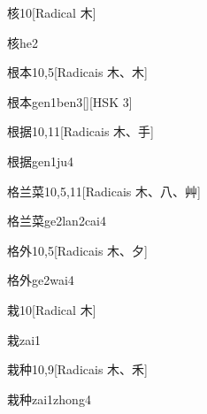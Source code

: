 \begin{entry}{核}{10}[Radical ⽊]
  \begin{phonetics}{核}{he2}
  \end{phonetics}
\end{entry}

\begin{entry}{根本}{10,5}[Radicais ⽊、⽊]
  \begin{phonetics}{根本}{gen1ben3}[][HSK 3]
  \end{phonetics}
\end{entry}

\begin{entry}{根据}{10,11}[Radicais ⽊、⼿]
  \begin{phonetics}{根据}{gen1ju4}
  \end{phonetics}
\end{entry}

\begin{entry}{格兰菜}{10,5,11}[Radicais ⽊、⼋、⾋]
  \begin{phonetics}{格兰菜}{ge2lan2cai4}
  \end{phonetics}
\end{entry}

\begin{entry}{格外}{10,5}[Radicais ⽊、⼣]
  \begin{phonetics}{格外}{ge2wai4}
  \end{phonetics}
\end{entry}

\begin{entry}{栽}{10}[Radical ⽊]
  \begin{phonetics}{栽}{zai1}
  \end{phonetics}
\end{entry}

\begin{entry}{栽种}{10,9}[Radicais ⽊、⽲]
  \begin{phonetics}{栽种}{zai1zhong4}
  \end{phonetics}
\end{entry}

